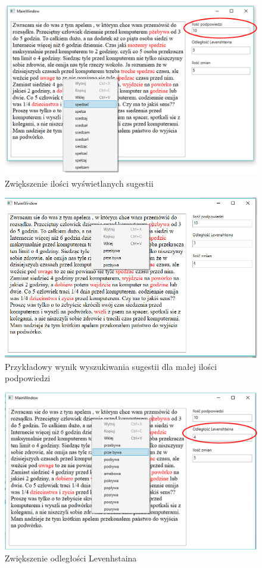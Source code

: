 \begin{figure} [H]
	\centering
	\includegraphics[width=1\linewidth]{rozdzial03/screen3_1.png}
	\caption{Zwiększenie ilości wyświetlanych sugestii}
	\label{fig:interfejs2}
\end{figure}

\begin{figure} [H]
	\centering
	\includegraphics[width=1\linewidth]{rozdzial03/screen4.png}
	\caption{Przykładowy wynik wyszukiwania sugestii dla małej ilości podpowiedzi}
	\label{fig:interfejs3}
\end{figure}

\begin{figure} [H]
	\centering
	\includegraphics[width=1\linewidth]{rozdzial03/screen5_1.png}
	\caption{Zwiększenie odległości Levenhstaina}
	\label{fig:interfejs4}
\end{figure}

